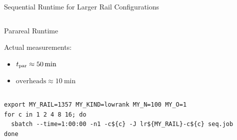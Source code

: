\begin{frame}[b,fragile]{Sequential Runtime for Larger Rail Configurations}
\begin{columns}[c,onlytextwidth]
\begin{block}{Parareal Runtime}
\begin{itemize}
    \end{itemize}
    \medskip
    Actual measurements:
    \begin{itemize}
      \item
        $t_\text{par} \approx \SI{50}{\minute}$
      \item
        $\text{overheads} \approx \SI{10}{\minute}$
    \end{itemize}
  \end{block}
  \centering
  \hyperlink{runtime}{}
  \hyperlink{speedup<2>}{}
  \vspace*{-\baselineskip}
  \end{columns}
  \onslide
  \vfill
  \begin{lstlisting}
export MY_RAIL=1357 MY_KIND=lowrank MY_N=100 MY_O=1
for c in 1 2 4 8 16; do
  sbatch --time=1:00:00 -n1 -c${c} -J lr${MY_RAIL}-c${c} seq.job
done
  \end{lstlisting}
\end{frame}

